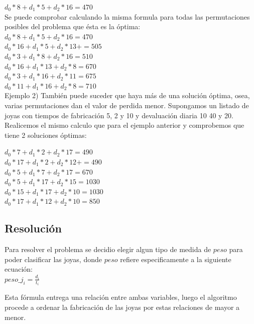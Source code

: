 $d_{0}*8 + d_{1}*5 + d_{2}*16 = 470$ \\

Se puede comprobar calculando la misma formula para todas las permutaciones posibles del problema que \'esta es la \'optima: \\

$d_{0}*8 + d_{1}*5 + d_{2}*16 = 470$ \\
$d_{0}*16 + d_{1}*5 + d_{2}*13 +  = 505$ \\
$d_{0}*3 + d_{1}*8 + d_{2}*16 = 510$ \\
$d_{0}*16 + d_{1}*13 + d_{2}*8 = 670$ \\
$d_{0}*3 + d_{1}*16 + d_{2}*11 = 675$ \\
$d_{0}*11 + d_{1}*16 + d_{2}*8 = 710$ \\

Ejemplo 2) Tambi\'en puede suceder que haya m\'as de una soluci\'on \'optima, osea, varias permutaciones dan el valor de perdida menor. Supongamos un listado de joyas con tiempos de fabricaci\'on 5, 2 y 10 y devaluaci\'on diaria 10 40 y 20. \\

Realicemos el mismo calculo que para el ejemplo anterior y comprobemos que tiene 2 soluciones \'optimas:

$d_{0}*7 + d_{1}*2 + d_{2}*17 = 490$ \\
$d_{0}*17 + d_{1}*2 + d_{2}*12 +  = 490$ \\
$d_{0}*5 + d_{1}*7 + d_{2}*17 = 670$ \\
$d_{0}*5 + d_{1}*17 + d_{2}*15 = 1030$ \\
$d_{0}*15 + d_{1}*17 + d_{2}*10 = 1030$ \\
$d_{0}*17 + d_{1}*12 + d_{2}*10 = 850$ \\

\subsection{Resoluci\'on}

Para resolver el problema se decidio elegir algun tipo de medida de $peso$ para poder clasificar las joyas, donde $peso$ refiere especificamente a la siguiente ecuaci\'on: \\

$peso\_j_{i} = \frac{d_{i}}{t_{i}}$

Esta f\'ormula entrega una relaci\'on entre ambas variables, luego el algoritmo procede a ordenar la fabricaci\'on de las joyas por estas relaciones de mayor a menor. \\

